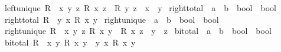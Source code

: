 \begin{isabellebody}
\ \ \ {\isachardoublequoteopen}left{\isacharunderscore}{\kern0pt}unique\ R\ {\isasymlongleftrightarrow}\ {\isacharparenleft}{\kern0pt}{\isasymforall}x\ y\ z{\isachardot}{\kern0pt}\ R\ x\ z\ {\isasymlongrightarrow}\ R\ y\ z\ {\isasymlongrightarrow}\ x\ {\isacharequal}{\kern0pt}\ y{\isacharparenright}{\kern0pt}{\isachardoublequoteclose}\isanewline
\isanewline
{}\isamarkupfalse%
\ right{\isacharunderscore}{\kern0pt}total\ {\isacharcolon}{\kern0pt}{\isacharcolon}{\kern0pt}\ {\isachardoublequoteopen}{\isacharparenleft}{\kern0pt}{\isacharprime}{\kern0pt}a\ {\isasymRightarrow}\ {\isacharprime}{\kern0pt}b\ {\isasymRightarrow}\ bool{\isacharparenright}{\kern0pt}\ {\isasymRightarrow}\ bool{\isachardoublequoteclose}\isanewline
\ \ \ {\isachardoublequoteopen}right{\isacharunderscore}{\kern0pt}total\ R\ {\isasymlongleftrightarrow}\ {\isacharparenleft}{\kern0pt}{\isasymforall}y{\isachardot}{\kern0pt}\ {\isasymexists}x{\isachardot}{\kern0pt}\ R\ x\ y{\isacharparenright}{\kern0pt}{\isachardoublequoteclose}\isanewline
\isanewline
{}\isamarkupfalse%
\ right{\isacharunderscore}{\kern0pt}unique\ {\isacharcolon}{\kern0pt}{\isacharcolon}{\kern0pt}\ {\isachardoublequoteopen}{\isacharparenleft}{\kern0pt}{\isacharprime}{\kern0pt}a\ {\isasymRightarrow}\ {\isacharprime}{\kern0pt}b\ {\isasymRightarrow}\ bool{\isacharparenright}{\kern0pt}\ {\isasymRightarrow}\ bool{\isachardoublequoteclose}\isanewline
\ \ \ {\isachardoublequoteopen}right{\isacharunderscore}{\kern0pt}unique\ R\ {\isasymlongleftrightarrow}\ {\isacharparenleft}{\kern0pt}{\isasymforall}x\ y\ z{\isachardot}{\kern0pt}\ R\ x\ y\ {\isasymlongrightarrow}\ R\ x\ z\ {\isasymlongrightarrow}\ y\ {\isacharequal}{\kern0pt}\ z{\isacharparenright}{\kern0pt}{\isachardoublequoteclose}\isanewline
\isanewline
{}\isamarkupfalse%
\ bi{\isacharunderscore}{\kern0pt}total\ {\isacharcolon}{\kern0pt}{\isacharcolon}{\kern0pt}\ {\isachardoublequoteopen}{\isacharparenleft}{\kern0pt}{\isacharprime}{\kern0pt}a\ {\isasymRightarrow}\ {\isacharprime}{\kern0pt}b\ {\isasymRightarrow}\ bool{\isacharparenright}{\kern0pt}\ {\isasymRightarrow}\ bool{\isachardoublequoteclose}\isanewline
\ \ \ {\isachardoublequoteopen}bi{\isacharunderscore}{\kern0pt}total\ R\ {\isasymlongleftrightarrow}\ {\isacharparenleft}{\kern0pt}{\isasymforall}x{\isachardot}{\kern0pt}\ {\isasymexists}y{\isachardot}{\kern0pt}\ R\ x\ y{\isacharparenright}{\kern0pt}\ {\isasymand}\ {\isacharparenleft}{\kern0pt}{\isasymforall}y{\isachardot}{\kern0pt}\ {\isasymexists}x{\isachardot}{\kern0pt}\ R\ x\ y{\isacharparenright}{\kern0pt}{\isachardoublequoteclose}\isanewline

\end{isabellebody}
